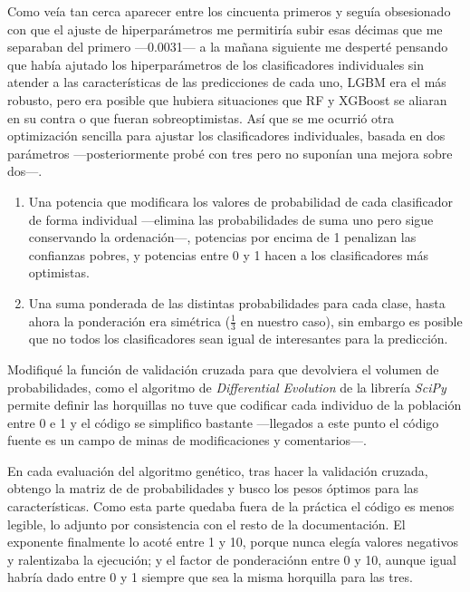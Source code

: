 \documentclass{article}
\begin{document}
Como veía tan cerca aparecer entre los cincuenta primeros y seguía obsesionado con que el ajuste de hiperparámetros me permitiría subir esas décimas que me separaban del primero ---0.0031--- a la mañana siguiente me desperté pensando que había ajutado los hiperparámetros de los clasificadores individuales sin atender a las características de las predicciones de cada uno, LGBM era el más robusto, pero era posible que hubiera situaciones que RF y XGBoost se aliaran en su contra o que fueran sobreoptimistas. Así que se me ocurrió otra optimización sencilla para ajustar los clasificadores individuales, basada en dos parámetros ---posteriormente probé con tres pero no suponían una mejora sobre dos---. 

\begin{enumerate}
\item Una potencia que modificara los valores de probabilidad de cada clasificador de forma individual ---elimina las probabilidades de suma uno pero sigue conservando la ordenación---, potencias por encima de 1 penalizan las confianzas pobres, y potencias entre 0 y 1 hacen a los clasificadores más optimistas.

\item Una suma ponderada de las distintas probabilidades para cada clase, hasta ahora la ponderación era simétrica ($\frac{1}{3}$ en nuestro caso), sin embargo es posible que no todos los clasificadores sean igual de interesantes para la predicción.
\end{enumerate}

Modifiqué la función de validación cruzada para que devolviera el volumen de probabilidades, como el algoritmo de \textit{Differential Evolution} de la librería \textit{SciPy} permite definir las horquillas no tuve que codificar cada individuo de la población entre 0 e 1 y el código se simplifico bastante ---llegados a este punto el código fuente es un campo de minas de modificaciones y comentarios---.

En cada evaluación del algoritmo genético, tras hacer la validación cruzada, obtengo la matriz de de probabilidades y busco los pesos óptimos para las características. Como esta parte quedaba fuera de la práctica el código es menos legible, lo adjunto por consistencia con el resto de la documentación. El exponente finalmente lo acoté entre 1 y 10, porque nunca elegía valores negativos y ralentizaba la ejecución; y el factor de ponderaciónn entre 0 y 10, aunque igual habría dado entre 0 y 1 siempre que sea la misma horquilla para las tres.
\end{document}

